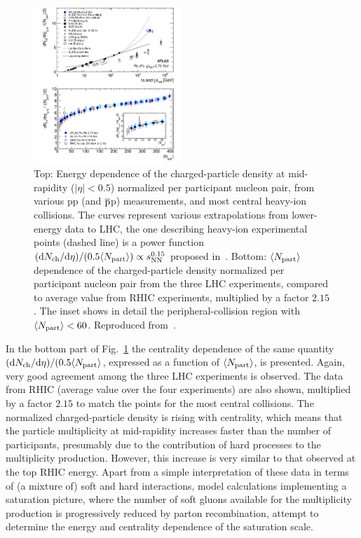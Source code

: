 \begin{figure}
\centering
\includegraphics[width=0.5\textwidth]{ksfigures/EnergCentMult.png}
\caption{Top: Energy dependence of the charged-particle density at mid-rapidity ($|\eta| < 0.5$) normalized per participant nucleon pair, from various pp (and $\overline{\rm p}$p) measurements, and most central heavy-ion collisions. The curves represent various extrapolations from lower-energy data to LHC, the one describing heavy-ion experimental points (dashed line) is a power function $({\rm d}N_{\rm ch}/{\rm d}\eta)/(0.5 \langle N_{\rm part} \rangle) \propto s_{\rm NN}^{0.15}$ proposed in~\cite{Aamodt:2010pb}. Bottom: $\langle N_{\rm part} \rangle$ dependence of the charged-particle density normalized per participant nucleon pair from the three LHC experiments, compared to average value from RHIC experiments, multiplied by a factor $2.15$. The inset shows in detail the peripheral-collision region with $\langle N_{\rm part} \rangle < 60$. Reproduced from~\cite{ATLAS:2011ag}.}
\label{figks:EnrgyMult}
\end{figure}

In the bottom part of Fig.~\ref{figks:EnrgyMult} the centrality dependence of the same quantity $({\rm d}N_{\rm ch}/{\rm d}\eta)/(0.5 \langle N_{\rm part} \rangle$, expressed as a function of $\langle N_{\rm part} \rangle$, is presented. Again, very good agreement among the three LHC experiments is observed. The data from RHIC (average value over the four experiments) are also shown, multiplied by a factor $2.15$ to match the points for the most central collisions. The normalized charged-particle density is rising with centrality, which means that the particle multiplicity at mid-rapidity increases faster than the number of participants, presumably due to the contribution of hard processes to the multiplicity production. However, this increase is very similar to that observed at the top RHIC energy. Apart from a simple interpretation of these data in terms of (a mixture of) soft and hard interactions, model calculations implementing a saturation picture, where the number of soft gluons available for the multiplicity production is progressively reduced by parton recombination, attempt to determine the energy and centrality dependence of the saturation scale.

